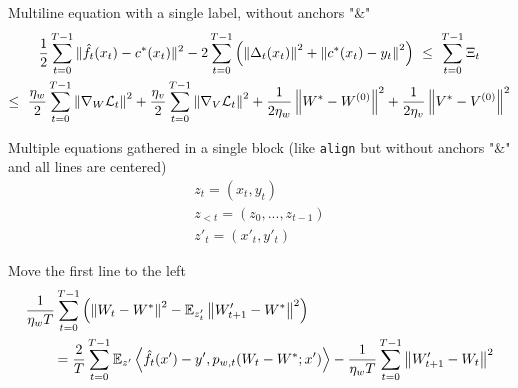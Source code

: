 \documentclass{article}
\begin{document}
Multiline equation with a single label, without anchors "\&"
\begin{multline}
    \frac{1}{2} \sum_{t=0}^{T-1} \| \hat{f}_t(x_t) - c^*(x_t) \|^2 
    - 2 \sum_{t=0}^{T-1} \left( \left\lVert \Delta_t(x_t) \right\rVert^2 + \left\lVert c^*(x_t) - y_t \right\rVert^2 \right)
    ~\leq~ \sum_{t=0}^{T-1} \Xi_t \\
    \leq~ \frac{\eta_w}{2} \sum_{t=0}^{T-1} \left\lVert \nabla_{W} \mathcal{L}_t \right\rVert^2 + \frac{\eta_v}{2} \sum_{t=0}^{T-1} \left\lVert \nabla_{V} \mathcal{L}_t \right\rVert^2
    + \frac{1}{2\eta_w}\left\lVert W^*-W^{(0)} \right\rVert^2 + \frac{1}{2\eta_v}\left\lVert V^*-V^{(0)} \right\rVert^2
\end{multline}

Multiple equations gathered in a single block (like \texttt{align} but without anchors "\&" and all lines are centered)
\begin{gather}
    z_t = (x_t,y_t) \\
    z_{<t} = (z_0, ..., z_{t-1}) \\
    z'_t = (x'_t,y'_t)
\end{gather}

Move the first line to the left
\begin{align}
    \MoveEqLeft \frac{1}{\eta_w T} \sum_{t=0}^{T-1} \left( \norm{W_t - W^*}^2 - \EE_{z'_t} \norm{W'_{t+1} - W^*}^2 \right) \\
    &= \frac{2}{T} \sum_{t=0}^{T-1} \EE_{z'} \left\langle \hf_t(x') - y', p_{w,t}(W_t - W^*; x') \right\rangle
    - \frac{1}{\eta_w T} \sum_{t=0}^{T-1} \norm{W'_{t+1} - W_t}^2 
\end{align}
\end{document}
